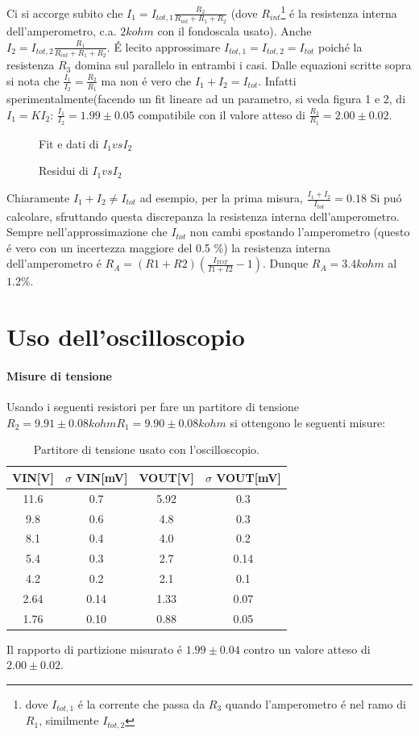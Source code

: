\documentclass[10pt,a4paper]{article}
\begin{document}
Ci si accorge subito che $I_1=I_{tot,1}\frac{R_2}{R_{int}+R_1+R_2}$ (dove $R_{int}$\footnote{dove $I_{tot, 1}$ \'e la corrente che passa da $R_3$ quando l'amperometro \'e nel ramo di $R_1$, similmente $I_{tot, 2}$ } \'e la resistenza interna dell'amperometro, c.a. $2 kohm$ con il fondoscala usato). Anche $I_2=I_{tot,2}\frac{R_1}{R_{int}+R_1+R_2}$. \'E lecito approssimare $I_{tot, 1}=I_{tot, 2}=I_{tot}$ poich\'e la resistenza $R_3$ domina sul parallelo in entrambi i casi.
Dalle equazioni scritte sopra si nota che $\frac{I_1}{I_2}=\frac{R_2}{R_1}$ ma non \'e vero che $I_1+I_2=I_{tot}$. Infatti sperimentalmente(facendo un fit lineare ad un parametro, si veda figura 1 e 2, di $I_1=K I_2$:
$\frac{I_1}{I_2}=1.99 \pm 0.05$
compatibile con il valore atteso di $\frac{R_2}{R_1}=2.00 \pm 0.02$.
\begin{figure}
\centering
\caption{Fit e dati di $I_1 vs I_2$}
\end{figure}
\begin{figure}
\centering
\caption{Residui di $I_1 vs I_2$}
\end{figure}
Chiaramente $I_1+I_2\neq I_{tot}$ ad esempio, per la prima misura, $\frac{I_1+I_2}{I_{tot}}=0.18$
Si pu\'o calcolare, sfruttando questa discrepanza la resistenza interna dell'amperometro. Sempre nell'approssimazione che $I_{tot}$ non cambi spostando l'amperometro (questo \'e vero con un incertezza maggiore del 0.5 \%) la resistenza interna dell'amperometro \'e $R_A = (R1+R2)\left(\frac{I_{TOT}}{I1+I2} - 1 \right)$. Dunque $R_A=3.4 kohm$ al $1.2 \%$.



\section{Uso dell'oscilloscopio}

\paragraph{Misure di tensione}
Usando i seguenti resistori per fare un partitore di tensione $ 
R_2=9.91\pm 0.08 kohm
R_1=9.90\pm 0.08 kohm$
si ottengono le seguenti misure:
\begin{table}[h]
\centering
\begin{tabular}{|c|c|c|c|}
\hline 
VIN[V]& $\sigma$ VIN[mV] &VOUT[V]	 & $\sigma$ VOUT[mV] \\
\hline 
11.6 & 0.7 & 5.92 & 0.3 \\
9.8 & 0.6 & 4.8 & 0.3 \\
8.1 & 0.4 & 4.0 & 0.2 \\
5.4 & 0.3 & 2.7 & 0.14 \\
4.2 & 0.2 & 2.1 & 0.1 \\
2.64 & 0.14 & 1.33 & 0.07 \\
1.76 & 0.10 & 0.88 & 0.05 \\
\hline 
\end{tabular} 
\caption{Partitore di tensione usato con l'oscilloscopio.\label{t:par1}}
\end{table}
Il rapporto di partizione misurato \'e $1.99\pm 0.04 $ contro un valore atteso di $2.00 \pm 0.02$.
\end{document}
